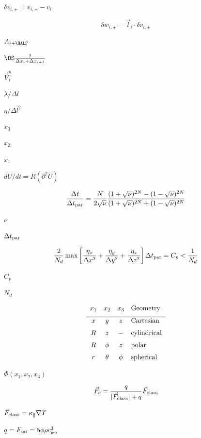\documentclass{article}
\begin{document}
$\delta v_{i,\pm} = v_{i,\pm} - v_i$
\pagebreak

\[    \delta w_{i,\pm} = \vec{l}_i\cdot\delta v_{i,\pm}
\]
\pagebreak

$A_{i+\HALF}$
\pagebreak

$\DS \frac{2}{\Delta x_i +
 \Delta x_{i+1}}$
\pagebreak

$ \vec{V}^n_i $
\pagebreak

$ \lambda/\Delta l$
\pagebreak

$ \eta/\Delta l^2$
\pagebreak

$x_3$
\pagebreak

$x_2$
\pagebreak

$x_1$
\pagebreak

$ dU/dt = R(\partial^2U)  $
\pagebreak

\[  \frac{\Delta t}{\Delta t_{\rm par}}
   =
  \frac{N}{2\sqrt{\nu}}\frac{(1+\sqrt{\nu})^{2N} - (1-\sqrt{\nu})^{2N}}
                            {(1+\sqrt{\nu})^{2N} + (1-\sqrt{\nu})^{2N}}
\]
\pagebreak

$\nu$
\pagebreak

$\Delta t_{\rm par}$
\pagebreak

\[  \frac{2}{N_d} \max\left[  \frac{\eta_x}{\Delta x^2} 
                          + \frac{\eta_y}{\Delta y^2} 
                          + \frac{\eta_z}{\Delta z^2} \right] 
  \Delta t_{\rm par} = C_p < \frac{1}{N_d}
\]
\pagebreak

$C_p$
\pagebreak

$ N_d $
\pagebreak

\[ \begin{array}{cccl}
   x_1  & x_2    & x_3  & \mathrm{Geometry}    \\ \noalign{\medskip}
    \hline
   x    &   y    &  z   & \mathrm{Cartesian}   \\ \noalign{\medskip}
   R    &   z    &  -   & \mathrm{cylindrical} \\ \noalign{\medskip}
   R    & \phi   &  z   & \mathrm{polar}       \\ \noalign{\medskip}
   r    & \theta & \phi & \mathrm{spherical} 
   \end{array}
\]
\pagebreak

$ \Phi(x_1,x_2,x_3) $
\pagebreak

\[   \vec{F}_c = \frac{q}{|\vec{F}_{\rm class}| + q}\vec{F}_{\rm class}
\]
\pagebreak

$ \vec{F}_{\rm class} = \kappa_\parallel \nabla T$
\pagebreak

$ q = F_{\rm sat} = 5\phi \rho c_{\rm iso}^3$
\pagebreak
\end{document}
